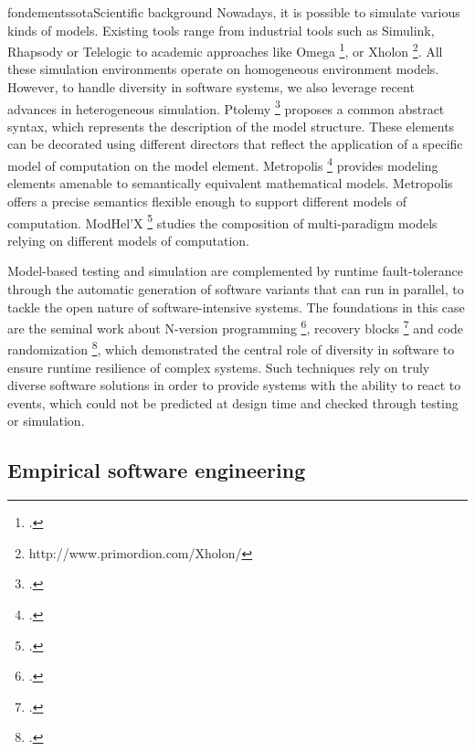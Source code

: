 \documentclass{ra2018}
\begin{document}
\begin{module}{fondements}{sota}{Scientific background}
Nowadays, it is possible to simulate various kinds of models. Existing tools range from industrial tools such as Simulink, Rhapsody or Telelogic to academic approaches like Omega   \footcite{ober2006validating}, or Xholon   \footnote{http://www.primordion.com/Xholon/}.  %
All these simulation environments operate on  homogeneous environment models. However, to handle diversity in software systems, we also leverage recent advances in heterogeneous simulation. 
Ptolemy   \footcite{buck1994ptolemy} proposes a common abstract syntax, which represents
the description of the model structure. These elements can be decorated using different
directors that reflect the application of a specific model of computation on the model element. 
Metropolis  \footcite{balarin2003metropolis} provides modeling elements amenable to semantically
equivalent mathematical models. Metropolis offers a precise semantics flexible enough to
support different models of computation.
ModHel'X   \footcite{hardebolle2008modhel} studies the composition of multi-paradigm models relying on
different models of computation. 



Model-based testing and simulation are complemented by runtime fault-tolerance through the automatic generation of software variants that can run in parallel, to tackle the open nature of software-intensive systems. The foundations in this case are  the seminal work about N-version programming   \footcite{avizienis85}, recovery blocks   \footcite{randell75} and code randomization   \footcite{barrantes05}, which demonstrated the central role of diversity in software to ensure runtime resilience of complex systems. Such techniques rely on truly diverse software solutions in order to provide systems with the ability to react to events, which could not be predicted at design time and checked through testing or simulation. 


\subsection{Empirical software engineering}


\end{module}
\end{document}
